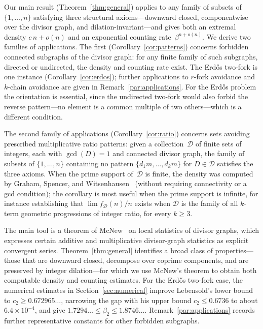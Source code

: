 \documentclass[11pt]{amsart}
\begin{document}
Our main result (Theorem~\ref{thm:general}) applies to any family of subsets of \(\{1,\dots,n\}\) satisfying three structural axioms---downward closed, componentwise over the divisor graph, and dilation-invariant---and gives both an extremal density \(c\,n+o(n)\) and an exponential counting rate~\(\beta^{n+o(n)}\). We derive two families of applications. The first (Corollary~\ref{cor:patterns}) concerns forbidden connected subgraphs of the divisor graph: for any finite family of such subgraphs, directed or undirected, the density and counting rate exist. The Erd\H{o}s two-fork is one instance (Corollary~\ref{cor:erdos}); further applications to \(r\)-fork avoidance and \(k\)-chain avoidance are given in Remark~\ref{par:applications}. For the Erd\H{o}s problem the orientation is essential, since the undirected two-fork would also forbid the reverse pattern---no element is a common multiple of two others---which is a different condition.

The second family of applications (Corollary~\ref{cor:ratio}) concerns sets avoiding prescribed multiplicative ratio patterns: given a collection~\(\mathcal{D}\) of finite sets of integers, each with \(\gcd(D)=1\) and connected divisor graph, the family of subsets of \(\{1,\dots,n\}\) containing no pattern \(\{d_1 m,\dots,d_k m\}\) for \(D\in\mathcal{D}\) satisfies the three axioms. When the prime support of~\(\mathcal{D}\) is finite, the density was computed by Graham, Spencer, and Witsenhausen~\cite{GSW77} (without requiring connectivity or a gcd condition); the corollary is most useful when the prime support is infinite, for instance establishing that \(\lim f_{\mathcal{D}}(n)/n\) exists when \(\mathcal{D}\) is the family of all \(k\)-term geometric progressions of integer ratio, for every \(k\ge 3\).

The main tool is a theorem of McNew~\cite{McNew21} on local statistics of divisor graphs, which expresses certain additive and multiplicative divisor-graph statistics as explicit convergent series. Theorem~\ref{thm:general} identifies a broad class of properties---those that are downward closed, decompose over coprime components, and are preserved by integer dilation---for which we use McNew's theorem to obtain both computable density and counting estimates. For the Erd\H{o}s two-fork case, the numerical estimates in Section~\ref{sec:numerical} improve Lebensold's lower bound to \(c_2\ge 0.672965\ldots\), narrowing the gap with his upper bound \(c_2\le 0.6736\) to about \(6.4\times 10^{-4}\), and give \(1.7294\ldots \le \beta_2 \le 1.8746\ldots\). Remark~\ref{par:applications} records further representative constants for other forbidden subgraphs.
\end{document}
